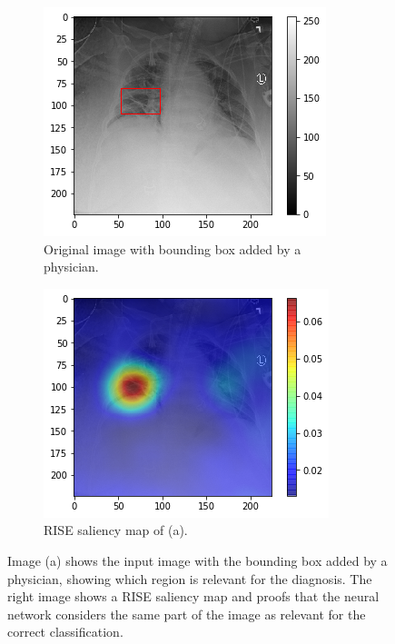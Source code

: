 \begin{figure}[H]
    \centering
    \begin{subfigure}[t]{.4\textwidth}
        \centering
        \includegraphics[width=\linewidth]{chapters/03_classification/images/rise0_bbox.png}
        \caption{Original image with bounding box added by a physician.}
    \end{subfigure}\hspace{1cm}%
    \begin{subfigure}[t]{.4\textwidth}
        \centering
        \includegraphics[width=\linewidth]{chapters/03_classification/images/rise0_saliency.png}
        \caption{RISE saliency map of (a).}
    \end{subfigure}
    \caption{Image (a) shows the input image with the bounding box added by a physician, showing which region is relevant for the diagnosis. The right image shows a RISE saliency map and proofs that the neural network considers the same part of the image as relevant for the correct classification.}
    \label{rise_example_1}
\end{figure}

